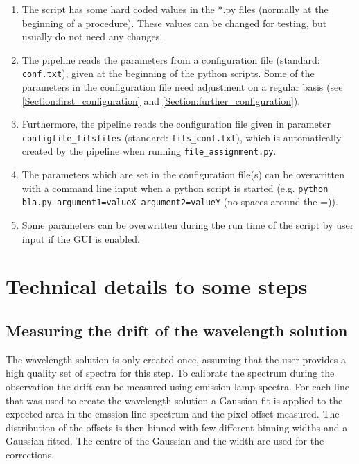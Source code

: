 \documentclass[10pt,a4paper]{article}
\begin{document}
\begin{enumerate}
  \item The script has some hard coded values in the *.py files (normally at the beginning of a procedure). These values can be changed for testing, but usually do not need any changes.
  \item The pipeline reads the parameters from a configuration file (standard: \verb|conf.txt|), given at the beginning of the python scripts. Some of the parameters in the configuration file need adjustment on a regular basis (see \ref{Section:first_configuration} and \ref{Section:further_configuration}).
  \item Furthermore, the pipeline reads the configuration file given in parameter \verb|configfile_fitsfiles| (standard: \verb|fits_conf.txt|), which is automatically created by the pipeline when running \verb|file_assignment.py|.
  \item The parameters which are set in the configuration file(s) can be overwritten with a command line input when a python script is started (e.g. \verb|python bla.py argument1=valueX argument2=valueY| (no spaces around the =)).
  \item Some parameters can be overwritten during the run time of the script by user input if the GUI is enabled.
\end{enumerate}


\newpage
\section{Technical details to some steps}

\subsection{Measuring the drift of the wavelength solution}
The wavelength solution is only created once, assuming that the user provides a high quality set of spectra for this step. To calibrate the spectrum during the observation the drift can be measured using emission lamp spectra. For each line that was used to create the wavelength solution a Gaussian fit is applied to the expected area in the emssion line spectrum and the pixel-offset measured. The distribution of the offsets is then binned with few different binning widths and a Gaussian fitted. The centre of the Gaussian and the width are used for the corrections.
\end{document}
